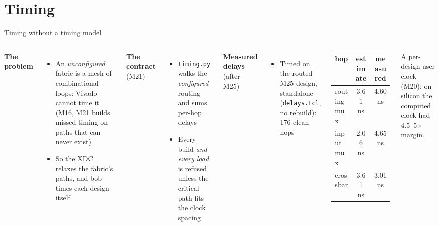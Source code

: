 \documentclass[aspectratio=169,11pt]{beamer}
\newcommand{\src}[1]{{\scriptsize\color{bobmute}#1}}
\begin{document}
\section{Timing}
\begin{frame}{Timing without a timing model}
  \begin{columns}[T]
    \textbf{The problem}
    \small
    \begin{itemize}
      \item An \emph{unconfigured} fabric is a mesh of combinational loops: Vivado cannot time it (M16, M21 builds missed timing on paths that can never exist)
      \item So the XDC relaxes the fabric's paths, and bob times each design itself
    \end{itemize}
    \textbf{The contract} (M21)
    \begin{itemize}
      \item \texttt{timing.py} walks the \emph{configured} routing and sums per-hop delays
      \item Every build \emph{and every load} is refused unless the critical path fits the clock spacing
    \end{itemize}
    \textbf{Measured delays} (after M25)
    \small
    \begin{itemize}
      \item Timed on the routed M25 design, standalone (\texttt{delays.tcl}, no rebuild): 176 clean hops
    \end{itemize}
    \centering
    \begin{tabular}{@{}lcc@{}}
      \toprule
      hop & estimate & measured \\
      \midrule
      routing mux & 3.61 ns & 4.60 ns \\
      input mux & 2.06 ns & 4.65 ns \\
      crossbar & 3.61 ns & 3.01 ns \\
      \bottomrule
    \end{tabular}
    \vspace{1mm}

    \src{A per-design user clock (M20); on silicon the computed clock had 4.5--5$\times$ margin.}
  \end{columns}
\end{frame}

\end{document}
